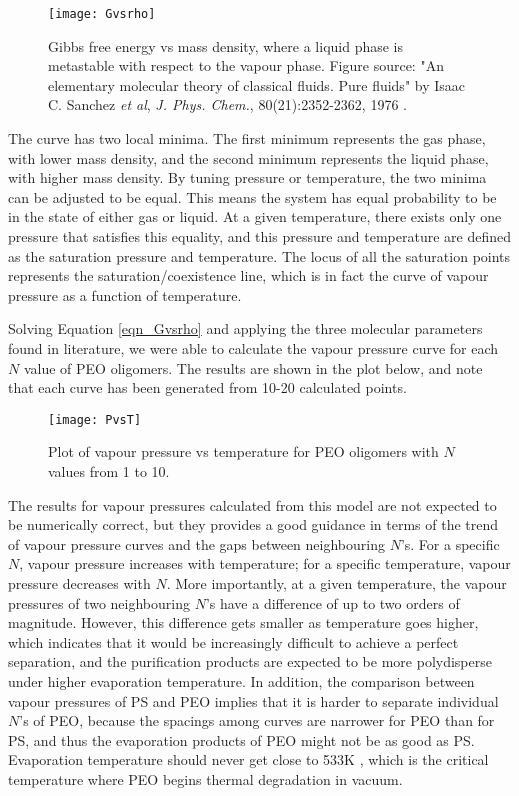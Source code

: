 \begin{figure}[H]
\center
\texttt{[image: Gvsrho]}
\caption[Gibbs free energy vs mass density, where a liquid phase is metastable with respect to the vapour phase]{Gibbs free energy vs mass density, where a liquid phase is metastable with respect to the vapour phase. Figure source: "An elementary molecular theory of classical fluids. Pure
fluids" by Isaac C. Sanchez \textit{et al}, \textit{J. Phys. Chem.}, 80(21):2352-2362, 1976 \cite{Sanchez1976}.}
\label{fig:Gvsrho}
\end{figure}

The curve has two local minima. The first minimum represents the gas phase, with lower mass density, and the second minimum represents the liquid phase, with higher mass density. By tuning pressure or temperature, the two minima can be adjusted to be equal. This means the system has equal probability to be in the state of either gas or liquid. At a given temperature, there exists only one pressure that satisfies this equality, and this pressure and temperature are defined as the saturation pressure and temperature. The locus of all the saturation points represents the saturation/coexistence line, which is in fact the curve of vapour pressure as a function of temperature.

Solving Equation \ref{eqn_Gvsrho} and applying the three molecular parameters found in literature, we were able to calculate the vapour pressure curve for each $N$ value of PEO oligomers. The results are shown in the plot below, and note that each curve has been generated from 10-20 calculated points.

\begin{figure}[H]
\center
\texttt{[image: PvsT]}
\caption{Plot of vapour pressure vs temperature for PEO oligomers with $N$ values from 1 to 10.}
\label{fig:VPvsT}
\end{figure}

The results for vapour pressures calculated from this model are not expected to be numerically correct, but they provides a good guidance in terms of the trend of vapour pressure curves and the gaps between neighbouring $N$'s. For a specific $N$, vapour pressure increases with temperature; for a specific temperature, vapour pressure decreases with $N$. More importantly, at a given temperature, the vapour pressures of two neighbouring $N$'s have a difference of up to two orders of magnitude. However, this difference gets smaller as temperature goes higher, which indicates that it would be increasingly difficult to achieve a perfect separation, and the purification products are expected to be more polydisperse under higher evaporation temperature. In addition, the comparison between vapour pressures of PS \cite{Zhu2017a} and PEO implies that it is harder to separate individual $N$'s of PEO, because the spacings among curves are narrower for PEO than for PS, and thus the evaporation products of PEO might not be as good as PS. Evaporation temperature should never get close to 533K \cite{Choukourov2009}, which is the critical temperature where PEO begins thermal degradation in vacuum.

